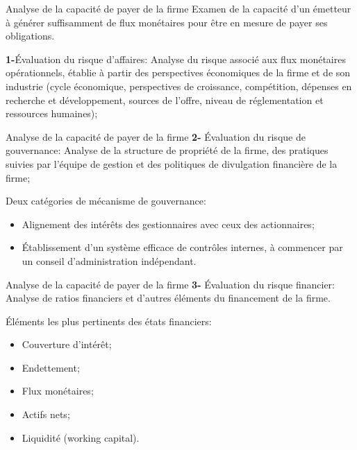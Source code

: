 \documentclass{beamer}
\begin{document}
\begin{frame}{Analyse de la capacité de payer de la firme}
Examen de la capacité d’un émetteur à générer suffisamment de flux monétaires pour être en mesure de payer ses obligations. 

\vspace{1cm}

\textbf{1-}Évaluation du risque d’affaires: Analyse du risque associé aux flux monétaires opérationnels, établie à partir des perspectives économiques de la firme et de son industrie (cycle économique, perspectives de croissance, compétition, dépenses en recherche et développement, sources de l’offre, niveau de réglementation et ressources humaines); 

\end{frame}

\begin{frame}{Analyse de la capacité de payer de la firme}
\textbf{2-} Évaluation du risque de gouvernance: Analyse de la structure de propriété de la firme, des pratiques suivies par l’équipe de gestion et des politiques de divulgation financière de la firme; \\ 

\vspace{1cm}
 
Deux catégories de mécanisme de gouvernance: 
\begin{itemize}
\item Alignement des intérêts des gestionnaires avec ceux des actionnaires;
\item Établissement d’un système efficace de contrôles internes, à commencer par un conseil d’administration indépendant.
\end{itemize} 
\end{frame}

\begin{frame}{Analyse de la capacité de payer de la firme}
\textbf{3-} Évaluation du risque financier: Analyse de ratios financiers et d’autres éléments du financement de la firme. 


\vspace{1cm}
 
Éléments les plus pertinents des états financiers: 
\begin{itemize}
\item Couverture d’intérêt;
\item Endettement;
\item Flux monétaires;
\item Actifs nets;
\item Liquidité (working capital).
\end{itemize}
\end{frame}
\end{document}
